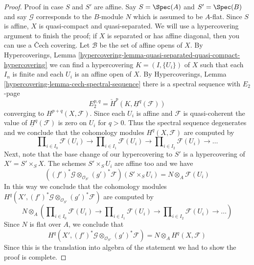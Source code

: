 \begin{proof}
\medskip\noindent
Proof in case $S$ and $S'$ are affine. Say $S = \Spec(A)$ and $S' = \Spec(B)$
and say $\mathcal{G}$ corresponds to the $B$-module $N$ which is assumed to be
$A$-flat. Since $S$ is affine, $X$ is quasi-compact and quasi-separated.
We will use a hypercovering argument to finish the proof; if $X$ is separated
or has affine diagonal, then you can use a {\v C}ech covering.
Let $\mathcal{B}$ be the set of affine opens of $X$. By
Hypercoverings,
Lemma \ref{hypercovering-lemma-quasi-separated-quasi-compact-hypercovering}
we can find a hypercovering $K = (I, \{U_i\})$ of $X$ such that each
$I_n$ is finite and each $U_i$ is an affine open of $X$. By
Hypercoverings, Lemma \ref{hypercovering-lemma-cech-spectral-sequence}
there is a spectral sequence with $E_2$-page
$$
E_2^{p, q} = \check{H}^p(K, \underline{H}^q(\mathcal{F}))
$$
converging to $H^{p + q}(X, \mathcal{F})$. Since each $U_i$ is affine
and $\mathcal{F}$ is quasi-coherent the value of
$\underline{H}^q(\mathcal{F})$ is zero on $U_i$ for $q > 0$. Thus the
spectral sequence degenerates and we conclude that the cohomology
modules $H^q(X, \mathcal{F})$ are computed by
$$
\prod\nolimits_{i \in I_0} \mathcal{F}(U_i)
\to
\prod\nolimits_{i \in I_1} \mathcal{F}(U_i)
\to
\prod\nolimits_{i \in I_2} \mathcal{F}(U_i)
\to \ldots
$$
Next, note that the base change of our hypercovering to
$S'$ is a hypercovering of $X' = S' \times_S X$.
The schemes $S' \times_S U_i$ are affine too
and we have
$$
\left((f')^*\mathcal{G} \otimes_{\mathcal{O}_{S'}} (g')^*\mathcal{F}\right)
(S' \times_S U_i) =
N \otimes_A \mathcal{F}(U_i)
$$
In this way we conclude that the cohomology modules
$H^q(X', (f')^*\mathcal{G} \otimes_{\mathcal{O}_{S'}} (g')^*\mathcal{F})$
are computed by
$$
N \otimes_A \left(
\prod\nolimits_{i \in I_0} \mathcal{F}(U_i)
\to
\prod\nolimits_{i \in I_1} \mathcal{F}(U_i)
\to
\prod\nolimits_{i \in I_2} \mathcal{F}(U_i)
\to \ldots
\right)
$$
Since $N$ is flat over $A$, we conclude that
$$
H^q(X', (f')^*\mathcal{G} \otimes_{\mathcal{O}_{S'}} (g')^*\mathcal{F})
=
N \otimes_A H^q(X, \mathcal{F})
$$
Since this is the translation into algebra of the statement
we had to show the proof is complete.
\end{proof}